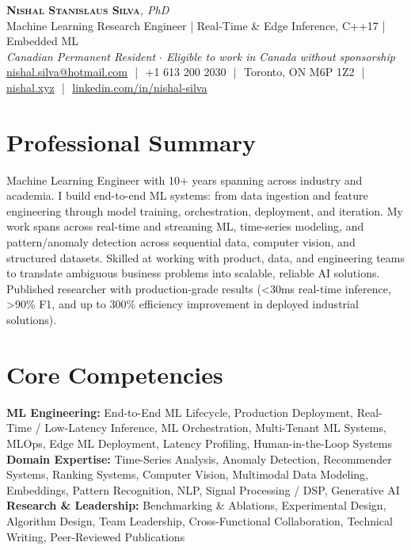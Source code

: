 \documentclass[11pt]{article}
\begin{document}
\pagestyle{empty}
\begin{center}
    {\LARGE \scshape \textbf{Nishal Stanislaus Silva}}{\large \textit{, PhD}}
    \\[1pt]
    {\small Machine Learning Research Engineer | Real-Time \& Edge Inference, C++17 | Embedded ML}
    \\[1pt]
    {\footnotesize\textit{Canadian Permanent Resident $\cdot$ Eligible to work in Canada without sponsorship}}
    \\[1pt]
    {\small \href{mailto:nishal.silva@hotmail.com}{nishal.silva@hotmail.com}
    \,\,|\,\, +1 613 200 2030
    \,\,|\,\, Toronto, ON M6P 1Z2
    \,\,|\,\, \href{https://nishal.xyz}{nishal.xyz}
    \,\,|\,\, \href{https://www.linkedin.com/in/nishal-silva}{linkedin.com/in/nishal-silva}}
\end{center}

\section*{Professional Summary}
Machine Learning Engineer with 10+ years spanning across industry and academia. I build end-to-end ML systems: from data ingestion and feature engineering through model training, orchestration, deployment, and iteration. My work spans across real-time and streaming ML, time-series modeling, and pattern/anomaly detection across sequential data, computer vision, and structured datasets. Skilled at working with product, data, and engineering teams to translate ambiguous business problems into scalable, reliable AI solutions. Published researcher with production-grade results (<30ms real-time inference, >90\% F1, and up to 300\% efficiency improvement in deployed industrial solutions).

\section*{Core Competencies}
\textbf{ML Engineering:} End-to-End ML Lifecycle, Production Deployment, Real-Time / Low-Latency Inference, ML Orchestration, Multi-Tenant ML Systems, MLOps, Edge ML Deployment, Latency Profiling, Human-in-the-Loop Systems\\
\textbf{Domain Expertise:} Time-Series Analysis, Anomaly Detection, Recommender Systems, Ranking Systems, Computer Vision, Multimodal Data Modeling, Embeddings, Pattern Recognition, NLP, Signal Processing / DSP, Generative AI\\
\textbf{Research \& Leadership:} Benchmarking \& Ablations, Experimental Design, Algorithm Design, Team Leadership, Cross-Functional Collaboration, Technical Writing, Peer-Reviewed Publications
\end{document}
